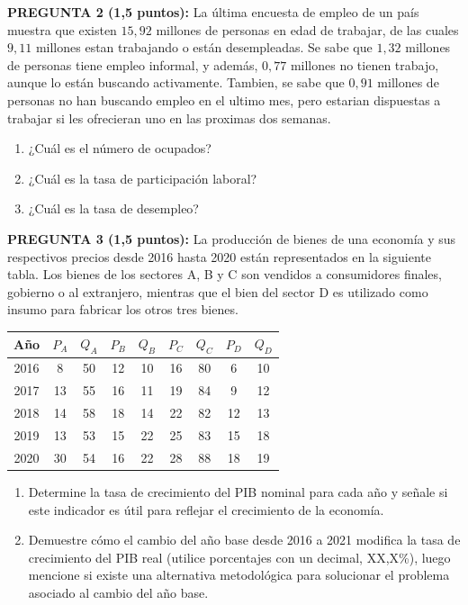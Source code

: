 \documentclass[11pt,addpoints]{article}
\begin{document}
\textbf{PREGUNTA 2 (1,5 puntos):}  
La última encuesta de empleo de un país muestra que existen $15,92$ millones de personas en edad de trabajar, de las cuales $9,11$ millones estan trabajando o están desempleadas. Se sabe que $1,32$ millones de personas tiene empleo informal, y además, $0,77$ millones no tienen trabajo, aunque lo están buscando activamente. Tambien, se sabe que $0,91$ millones de personas no han buscando empleo en el ultimo mes, pero estarian dispuestas a trabajar si les ofrecieran uno en las proximas dos semanas.

\begin{enumerate}[label=\alph*)]
    \item ¿Cuál es el número de ocupados?  
    \item ¿Cuál es la tasa de participación laboral?  
    \item ¿Cuál es la tasa de desempleo?  
\end{enumerate}

\vspace{0.3cm}

\textbf{PREGUNTA 3 (1,5 puntos):}
La producción de bienes de una economía y sus respectivos precios desde 2016 hasta 2020 están representados en la siguiente tabla. Los bienes de los sectores A, B y C son vendidos a consumidores finales, gobierno o al extranjero, mientras que el bien del sector D es utilizado como insumo para fabricar los otros tres bienes.

\begin{center}
\begin{tabular}{c c c c c c c c c}
\toprule
\textbf{Año} & $P_A$ & $Q_A$ & $P_B$ & $Q_B$ & $P_C$ & $Q_C$ & $P_D$ & $Q_D$ \\
\midrule
2016 & 8  & 50 & 12 & 10 & 16 & 80 & 6  & 10 \\
2017 & 13 & 55 & 16 & 11 & 19 & 84 & 9  & 12 \\
2018 & 14 & 58 & 18 & 14 & 22 & 82 & 12 & 13 \\
2019 & 13 & 53 & 15 & 22 & 25 & 83 & 15 & 18 \\
2020 & 30 & 54 & 16 & 22 & 28 & 88 & 18 & 19 \\
\bottomrule
\end{tabular}
\end{center}
\newpage
\vspace*{0.1cm}
\begin{enumerate}[label=\alph*)]
  \item Determine la tasa de crecimiento del PIB nominal para cada año y señale si este indicador es útil para reflejar el crecimiento de la economía.
  \item Demuestre cómo el cambio del año base desde 2016 a 2021 modifica la tasa de crecimiento del PIB real (utilice porcentajes con un decimal, XX,X\%), luego mencione si existe una alternativa metodológica para solucionar el problema asociado al cambio del año base.
\end{enumerate}
\end{document}

